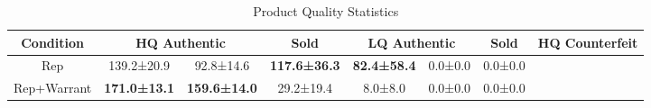 \begin{table}[t]
    \centering
    \caption{Product Quality Statistics}
    \label{tab:rq1_product_quality}
    \begin{tabular}{ccccccc}
    \toprule
    \textbf{Condition} & \multicolumn{2}{c}{HQ Authentic} & \textbf{Sold} & \multicolumn{2}{c}{LQ Authentic} & \textbf{Sold} & \multicolumn{2}{c}{HQ Counterfeit} \\
    \midrule
    Rep & 139.2±20.9 & 92.8±14.6 & \textbf{117.6±36.3} & \textbf{82.4±58.4} & 0.0±0.0 & 0.0±0.0 \\
    Rep+Warrant & \textbf{171.0±13.1} & \textbf{159.6±14.0} & 29.2±19.4 & 8.0±8.0 & 0.0±0.0 & 0.0±0.0 \\
    \bottomrule
    \end{tabular}
\end{table}